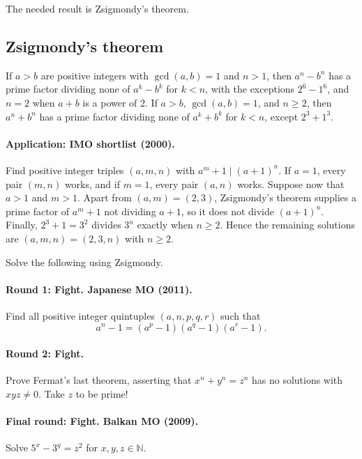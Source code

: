 \documentclass[11pt,a4paper]{article}
\begin{document}
The needed result is Zsigmondy's theorem.
\subsection{Zsigmondy's theorem}
\setcounter{theorem}{100}\begin{lemma}\label{lemma:lb2-104}
If $a>b$ are positive integers with $\gcd(a,b)=1$ and $n>1$, then $a^n-b^n$ has a prime factor dividing none of $a^k-b^k$ for $k<n$,
with the exceptions $2^6-1^6$, and $n=2$ when $a+b$ is a power of $2$.
If $a>b$, $\gcd(a,b)=1$, and $n\geq2$, then
$a^n+b^n$ has a prime factor dividing none of $a^k+b^k$ for $k<n$, except $2^3+1^3$.
\end{lemma}
\paragraph{Application: IMO shortlist (2000).}
Find positive integer triples $(a,m,n)$ with $a^m+1\mid(a+1)^n$.
If $a=1$, every pair $(m,n)$ works, and if $m=1$, every pair $(a,n)$ works.
Suppose now that $a>1$ and $m>1$. Apart from $(a,m)=(2,3)$, Zsigmondy's theorem supplies a prime factor of $a^m+1$ not dividing $a+1$,
so it does not divide $(a+1)^n$. Finally, $2^3+1=3^2$ divides $3^n$ exactly when $n\geq2$.
Hence the remaining solutions are $(a,m,n)=(2,3,n)$ with $n\geq2$.

Solve the following using Zsigmondy.
\paragraph{Round 1: Fight. Japanese MO (2011).}
Find all positive integer quintuples $(a,n,p,q,r)$ such that
\[a^n-1=(a^p-1)(a^q-1)(a^r-1).\]
\paragraph{Round 2: Fight.}
Prove Fermat's last theorem, asserting that $x^n+y^n=z^n$ has no solutions
with $xyz\ne0$. Take $z$ to be prime!
\paragraph{Final round: Fight. Balkan MO (2009).}
Solve $5^x-3^y=z^2$ for $x,y,z\in\mathbb N$.

\end{document}
